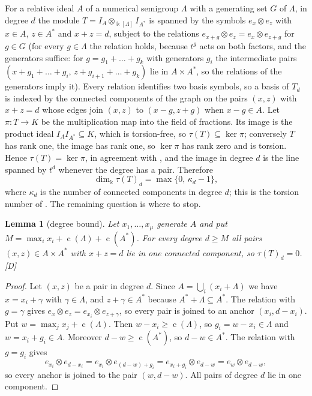 \documentclass[11pt]{article}
\newtheorem{lemma}[theorem]{Lemma}
\theoremstyle{definition}
\theoremstyle{remark}
\newcommand{\kk}{\Bbbk}
\newcommand{\tor}{\tau}
\newcommand{\cond}{\operatorname{c}}
\newcommand{\mD}{\emph{[D]}}
\begin{document}
For a relative ideal $A$ of a numerical semigroup $\Lambda$ with a generating set $G$ of $\Lambda$, in degree $d$ the
module $T=I_A\otimes_{\kk[\Lambda]}I_{A^*}$ is spanned by the symbols $e_x\otimes e_z$ with $x\in A$, $z\in A^*$ and
$x+z=d$, subject to the relations $e_{x+g}\otimes e_z=e_x\otimes e_{z+g}$ for $g\in G$ (for every $g\in\Lambda$ the
relation holds, because $t^g$ acts on both factors, and the generators suffice: for $g=g_1+\dots+g_k$ with generators $g_i$ the intermediate pairs $(x+g_1+\dots+g_i,\,z+g_{i+1}+\dots+g_k)$ lie in $A\times A^*$, so the relations of the generators imply it). Every relation identifies two basis
symbols, so a basis of $T_d$ is indexed by the connected components of the graph on the pairs $(x,z)$ with $x+z=d$ whose
edges join $(x,z)$ to $(x-g,z+g)$ when $x-g\in A$. Let $\pi\colon T\to K$ be the multiplication map into the field
of fractions. Its image is the product ideal $I_AI_{A^*}\subseteq K$, which is torsion-free, so $\tor(T)\subseteq\ker\pi$;
conversely $T$ has rank one, the image has rank one, so $\ker\pi$ has rank zero and is torsion. Hence
$\tor(T)=\ker\pi$, in agreement with \cite[Section~1]{Leamer2012}, and the image in degree $d$ is the line spanned by $t^d$
whenever the degree has a pair. Therefore
\begin{equation}\label{eq:components}
\dim_\kk\tor(T)_d=\max\{0,\,\kappa_d-1\},
\end{equation}
where $\kappa_d$ is the number of connected components in degree $d$; this is the torsion number of
\cite[Definition~2.5 and Remark~2.6]{Leamer2012}. The remaining question is where to stop.

\begin{lemma}[degree bound]\label{lem:bound}
Let $x_1,\dots,x_\mu$ generate $A$ and put $M=\max_ix_i+\cond(\Lambda)+\cond(A^*)$. For every degree $d\ge M$ all pairs
$(x,z)\in A\times A^*$ with $x+z=d$ lie in one connected component, so $\tor(T)_d=0$. \mD{}
\end{lemma}

\begin{proof}
Let $(x,z)$ be a pair in degree $d$. Since $A=\bigcup_i(x_i+\Lambda)$ we have $x=x_i+\gamma$ with $\gamma\in\Lambda$, and
$z+\gamma\in A^*$ because $A^*+\Lambda\subseteq A^*$. The relation with $g=\gamma$ gives
$e_x\otimes e_z=e_{x_i}\otimes e_{z+\gamma}$, so every pair is joined to an anchor $(x_i,d-x_i)$. Put
$w=\max_jx_j+\cond(\Lambda)$. Then $w-x_i\ge\cond(\Lambda)$, so $g_i=w-x_i\in\Lambda$ and $w=x_i+g_i\in A$. Moreover
$d-w\ge\cond(A^*)$, so $d-w\in A^*$. The relation with $g=g_i$ gives
\[
e_{x_i}\otimes e_{d-x_i}=e_{x_i}\otimes e_{(d-w)+g_i}=e_{x_i+g_i}\otimes e_{d-w}=e_w\otimes e_{d-w},
\]
so every anchor is joined to the pair $(w,d-w)$. All pairs of degree $d$ lie in one component.
\end{proof}
\end{document}
